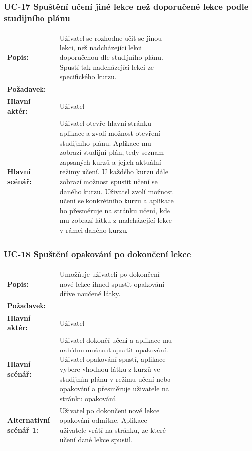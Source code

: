\subsubsection{UC-17 Spuštění učení jiné lekce než doporučené lekce podle studijního plánu}

\begin{tabular}{lp{0.7\linewidth}}
  \textbf{Popis:} & Uživatel se rozhodne učit se jinou lekci, než nadcházející lekci doporučenou dle studijního plánu. Spustí tak nadcházející lekci ze specifického kurzu. \\
  \textbf{Požadavek:} & \nameref{sec:fp-study-plan-learning} \\
  \textbf{Hlavní aktér:} & Uživatel \\
  \textbf{Hlavní scénář:} & Uživatel otevře hlavní stránku aplikace a zvolí možnost otevření studijního plánu. Aplikace mu zobrazí studijní plán, tedy seznam zapsaných kurzů a jejich aktuální režimy učení. U každého kurzu dále zobrazí možnost spustit učení se daného kurzu. Uživatel zvolí možnost učení se konkrétního kurzu a aplikace ho přesměruje na stránku učení, kde mu zobrazí látku z nadcházející lekce v rámci daného kurzu. \\
\end{tabular}

\subsubsection{UC-18 Spuštění opakování po dokončení lekce}

\begin{tabular}{lp{0.7\linewidth}}
  \textbf{Popis:} & Umožňuje uživateli po dokončení nové lekce ihned spustit opakování dříve naučené látky. \\
  \textbf{Požadavek:} & \nameref{sec:fp-post-lesson-review} \\
  \textbf{Hlavní aktér:} & Uživatel \\
  \textbf{Hlavní scénář:} & Uživatel dokončí učení a aplikace mu nabídne možnost spustit opakování. Uživatel opakování spustí, aplikace vybere vhodnou látku z kurzů ve studijním plánu v režimu učení nebo opakování a přesměruje uživatele na stránku opakování. \\
  \textbf{Alternativní scénář 1:} & Uživatel po dokončení nové lekce opakování odmítne. Aplikace uživatele vrátí na stránku, ze které učení dané lekce spustil. \\
\end{tabular}

